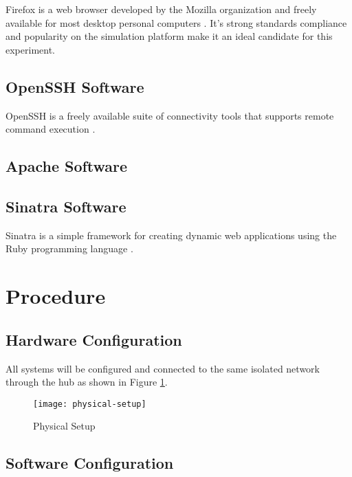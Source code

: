 Firefox is a web browser developed by the Mozilla organization and freely
available for most desktop personal computers \parencite{mozilla}. It's strong
standards compliance \parencite{Hammond:2010fk} and popularity
\parencite{:2010kx,:2010vn} on the simulation platform make it an ideal
candidate for this experiment.

\subsection{OpenSSH Software}

OpenSSH is a freely available suite of connectivity tools
\parencite{:2010zr,:ve} that supports remote command execution
\parencite{Tucker:2010ly}.

\cite{:2010zr}

\subsection{Apache Software}

\cite{:qf}

\subsection{Sinatra Software}

Sinatra is a simple framework for creating dynamic web applications using the
Ruby programming language \parencite{:2010bh}.

\section{Procedure}

\subsection{Hardware Configuration}

All systems will be configured and connected to the same isolated network
through the hub as shown in Figure \ref{physical-setup}.

\begin{figure}[H]
  \centering\texttt{[image: physical-setup]}
  \caption{Physical Setup}
  \label{physical-setup}
\end{figure}

\subsection{Software Configuration}


